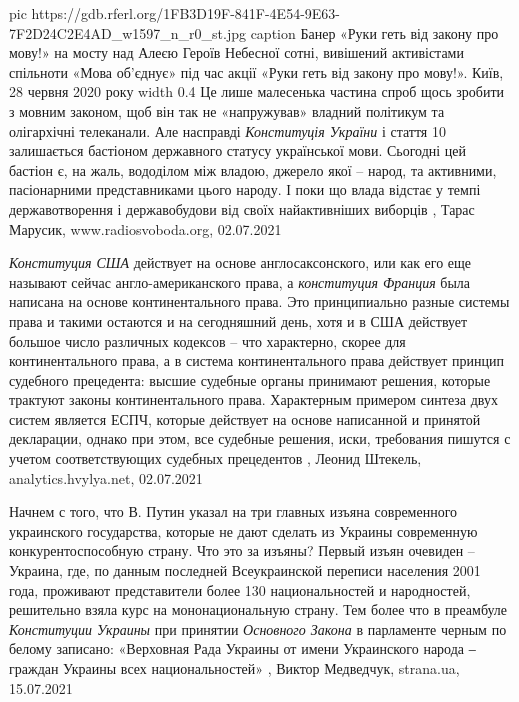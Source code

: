 \ifcmt
  pic https://gdb.rferl.org/1FB3D19F-841F-4E54-9E63-7F2D24C2E4AD_w1597_n_r0_st.jpg
	caption Банер «Руки геть від закону про мову!» на мосту над Алеєю Героїв Небесної сотні, вивішений активістами спільноти «Мова об’єднує» під час акції «Руки геть від закону про мову!». Київ, 28 червня 2020 року
	width 0.4
\fi
Це лише малесенька частина спроб щось зробити з мовним законом, щоб він так не
«напружував» владний політикум та олігархічні телеканали. Але насправді
\emph{Конституція України} і стаття 10 залишається бастіоном державного статусу
української мови. Сьогодні цей бастіон є, на жаль, вододілом між владою,
джерело якої – народ, та активними, пасіонарними представниками цього народу. І
поки що влада відстає у темпі державотворення і державобудови від своїх
найактивніших виборців
, 
Тарас Марусик, www.radiosvoboda.org, 02.07.2021

\emph{Конституция США} действует на основе англосаксонского, или как его еще называют
сейчас англо-американского права, а \emph{конституция Франция} была написана на основе
континентального права. Это принципиально разные системы права и такими
остаются и на сегодняшний день, хотя и в США действует большое число различных
кодексов -- что характерно, скорее для континентального права, а в система
континентального права действует принцип судебного прецедента: высшие судебные
органы принимают решения, которые трактуют законы континентального права.
Характерным примером синтеза двух систем является ЕСПЧ, которые действует на
основе написанной и принятой декларации, однако при этом, все судебные решения,
иски, требования пишутся с учетом соответствующих судебных прецедентов
, 
Леонид Штекель, analytics.hvylya.net, 02.07.2021

Начнем с того, что В. Путин указал на три главных изъяна современного
украинского государства, которые не дают сделать из Украины современную
конкурентоспособную страну. Что это за изъяны? Первый изъян очевиден – Украина,
где, по данным последней Всеукраинской переписи населения 2001 года, проживают
представители более 130 национальностей и народностей, решительно взяла курс на
мононациональную страну. Тем более что в преамбуле \emph{Конституции Украины} при
принятии \emph{Основного Закона} в парламенте черным по белому записано: «Верховная
Рада Украины от имени Украинского народа ‒ граждан Украины всех
национальностей»
, 
Виктор Медведчук, strana.ua, 15.07.2021

